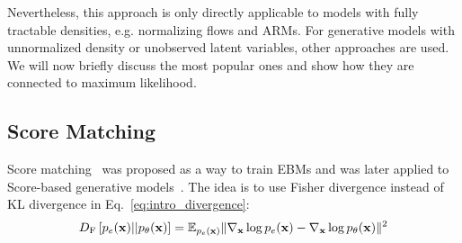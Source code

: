 Nevertheless, this approach is only directly applicable to models with fully tractable densities, e.g. normalizing flows and ARMs. For generative models with unnormalized density or unobserved latent variables, other approaches are used. 
We will now briefly discuss the most popular ones and show how they are connected to maximum likelihood.


\subsection{Score Matching}
Score matching~\citep{hyvarinen2005estimation} was proposed as a way to train EBMs and was later applied to Score-based generative models~\citep{song2019generative}. The idea is to use Fisher divergence instead of KL divergence in Eq.~\ref{eq:intro_divergence}:
\begin{equation}\label{eq:score_divergence}
\begin{aligned}
D_{\text{F}}\left[p_{e}(\rvx)||p_{\theta}(\rvx)\right]  =  \E_{p_{e}(\rvx)}\|\nabla_{\rvx} \log p_{e}(\rvx) - \nabla_{\rvx}\log p_{\theta}(\rvx)\|^2
\end{aligned}
\end{equation}

